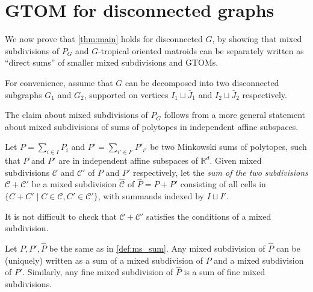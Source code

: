 \documentclass[letterpaper,reqno,11pt]{amsart}
\begin{document}
\section{GTOM for disconnected graphs}\label{sec:disconn_gtom}

We now prove that \cref{thm:main} holds for disconnected $G$, by showing that mixed subdivisions of $P_G$ and $G$-tropical oriented matroids can be separately written as ``direct sums'' of smaller mixed subdivisions and GTOMs. 

For convenience, assume that $G$ can be decomposed into two disconnected subgraphs $G_1$ and $G_2$, supported on vertices $I_1\sqcup \bar{J}_1$ and $I_2 \sqcup \bar{J}_2$ respectively.

The claim about mixed subdivisions of $P_G$ follows from a more general statement about mixed subdivisions of sums of polytopes in independent affine subspaces.

\begin{definition}\label{def:ms_sum}
    Let $P = \sum_{i\in I} P_i$ and $P' = \sum_{i'\in I'} P'_{i'}$ be two Minkowski sums of polytopes, such that $P$ and $P'$ are in independent affine subspaces of $\mathbb{R}^d$. Given mixed subdivisions $\mathcal{C}$ and $\mathcal{C}'$ of $P$ and $P'$ respectively, let the \emph{sum of the two subdivisions} $\mathcal{C} + \mathcal{C}'$ be a mixed subdivision $\hat{\mathcal{C}}$ of $\hat{P} = P + P'$ consisting of all cells in $\{C + C'\mid C\in \mathcal{C}, C'\in \mathcal{C}'\}$, with summands indexed by $I\sqcup I'$.
\end{definition}

It is not difficult to check that $\mathcal{C} + \mathcal{C}'$ satisfies the conditions of a mixed subdivision.

\begin{proposition}\label{prop:ms_decomp}
    Let $P, P', \hat{P}$ be the same as in \cref{def:ms_sum}. Any mixed subdivision of $\hat{P}$ can be (uniquely) written as a sum of a mixed subdivision of $P$ and a mixed subdivision of $P'$. Similarly, any fine mixed subdivision of $\hat{P}$ is a sum of fine mixed subdivisions.
\end{proposition}
\end{document}
